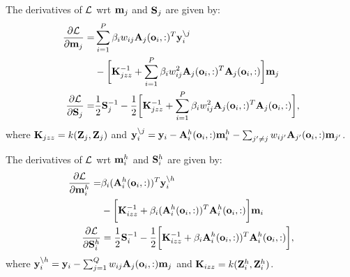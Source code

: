 
\newcommand{\Lgj}{\calL^g_j}
\newcommand{\ynoj}{\y_i^{\backslash j}}
\newcommand{\Kjzz}{\mat{K}_{jzz}}
\noindent The derivatives of $\calL$ wrt $\m_j$ and $\S_j$ are given by:
\begin{align}
\nonumber
\deriv{\calL}{\m_j} 
=& \sum_{i=1}^P \beta_i w_{ij} \A_j(\oi,:)^T \ynoj \\
&- \bigg[\Kjzz^{-1} + \sum_{i=1}^P \beta_i w_{ij}^2 \A_j(\oi,:)^T \A_j(\oi,:) \bigg] \m_j \\
\deriv{\calL}{\S_j} 
=& \frac{1}{2} \S_j^{-1} - \frac{1}{2} \bigg[ \Kjzz^{-1} + \sum_{i=1}^P \beta_i w_{ij}^2 \A_j(\oi,:)^T \A_j(\oi,:) \bigg],
\end{align}
where $\Kjzz = k(\Zj,\Zj)$ and $\y_i^{\backslash j} = \y_i - \Ahi(\oi,:) \mhi - \sum_{j' \neq j} w_{ij'} \A_{j'}(\oi,:) \m_{j'}$.

\newcommand{\Lhi}{\calL^h_i}
\newcommand{\Kizz}{\mat{K}_{izz}}
\noindent The derivatives of $\calL$ wrt $\mhi$ and $\Shi$ are given by:
\newcommand{\ynoh}{\y_i^{\backslash h}}
\begin{align}
\nonumber
\deriv{\calL}{\mhi}
= & \beta_i (\Ahi(\oi,:))^T \ynoh \\ 
& - \bigg[\Kizz^{-1} +  \beta_i (\Ahi(\oi,:))^T \Ahi(\oi,:) \bigg] \m_i \\
\deriv{\calL}{\Shi} 
&= \frac{1}{2} \S_i^{-1} - \frac{1}{2} \bigg[ \Kizz^{-1} + \beta_i \Ahi(\oi,:))^T \Ahi(\oi,:) \bigg] ,
\end{align}
where $\ynoh = \y_i - \sum_{j=1}^Q w_{ij} \A_j(\oi,:) \m_j$ and $\Kizz = k(\Zhi, \Zhi)$.

